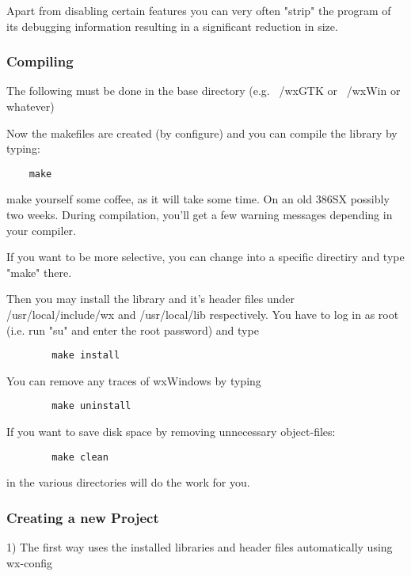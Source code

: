 Apart from disabling certain features you can very often "strip"
the program of its debugging information resulting in a significant
reduction in size.

\subsubsection{Compiling}

The following must be done in the base directory (e.g. ~/wxGTK
or ~/wxWin or whatever)

Now the makefiles are created (by configure) and you can compile 
the library by typing:

\begin{verbatim}
	make
\end{verbatim}

make yourself some coffee, as it will take some time. On an old
386SX possibly two weeks. During compilation, you'll get a few 
warning messages depending in your compiler.

If you want to be more selective, you can change into a specific
directiry and type "make" there.

Then you may install the library and it's header files under
/usr/local/include/wx and /usr/local/lib respectively. You
have to log in as root (i.e. run "su" and enter the root
password) and type

\begin{verbatim}
        make install	
\end{verbatim}

You can remove any traces of wxWindows by typing

\begin{verbatim}
        make uninstall
\end{verbatim}
	
If you want to save disk space by removing unnecessary
object-files:

\begin{verbatim}
	    make clean
\end{verbatim}

in the various directories will do the work for you.

\subsubsection{Creating a new Project}

1) The first way uses the installed libraries and header files
automatically using wx-config


